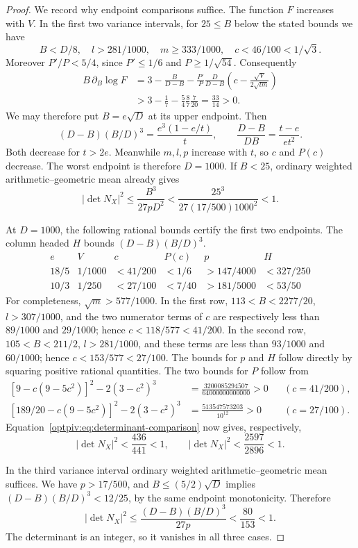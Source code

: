 \begin{proof}
We record why endpoint comparisons suffice. The function $F$ increases
with $V$. In the first two variance intervals, for $25\le B$ below the
stated bounds we have
\[
 B<D/8,\quad l>281/1000,\quad m\ge333/1000,
 \quad c<46/100<1/\sqrt3.
\]
Moreover $P'/P<5/4$, since $P'\le1/6$ and $P\ge1/\sqrt{54}$.
Consequently
\[
\begin{split}
 B\,\partial_B\log F
 &=3-\frac{B}{D-B}
 -\frac{P'}P\frac{D}{D-B}
       \left(c-\frac{\sqrt V}{2\sqrt{lm}}\right)\\
 &>3-\frac17-\frac54\frac87\frac7{20}
 =\frac{33}{14}>0.
\end{split}
\]
We may therefore put $B=e\sqrt D$ at its upper endpoint. Then
\[
 (D-B)(B/D)^3=\frac{e^3(1-e/t)}t,\qquad
 \frac{D-B}{DB}=\frac{t-e}{et^2}.
\]
Both decrease for $t>2e$. Meanwhile $m,l,p$ increase with $t$, so
$c$ and $P(c)$ decrease. The worst endpoint is therefore $D=1000$.
If $B<25$, ordinary weighted arithmetic--geometric mean already gives
\[
 |\det N_X|^2\le\frac{B^3}{27pD^2}
 <\frac{25^3}{27(17/500)1000^2}<1.
\]

At $D=1000$, the following rational bounds certify the first two
endpoints. The column headed $H$ bounds $(D-B)(B/D)^3$.
\[
\begin{array}{c|c|c|c|c|c}
 e&V&c&P(c)&p&H\\ \hline
 18/5&1/1000&<41/200&<1/6&>147/4000&<327/250\\
 10/3&1/250&<27/100&<7/40&>181/5000&<53/50
\end{array}
\]
For completeness, $\sqrt m>577/1000$. In the first row,
$113<B<2277/20$, $l>307/1000$, and the two numerator terms of $c$
are respectively less than $89/1000$ and $29/1000$; hence
$c<118/577<41/200$. In the second row, $105<B<211/2$,
$l>281/1000$, and these terms are less than $93/1000$ and $60/1000$;
hence $c<153/577<27/100$. The bounds for $p$ and $H$ follow directly
by squaring positive rational quantities. The two bounds for $P$ follow
from
\[
\begin{aligned}
 [9-c(9-5c^2)]^2-2(3-c^2)^3
 &=\frac{3200085294507}{64000000000000}>0
 &&(c=41/200),\\
 [189/20-c(9-5c^2)]^2-2(3-c^2)^3
 &=\frac{513547573203}{10^{12}}>0
 &&(c=27/100).
\end{aligned}
\]
Equation~\eqref{optpiv:eq:determinant-comparison} now gives, respectively,
\[
 |\det N_X|^2<\frac{436}{441}<1,
 \qquad |\det N_X|^2<\frac{2597}{2896}<1.
\]

In the third variance interval ordinary weighted arithmetic--geometric
mean suffices. We have $p>17/500$, and $B\le(5/2)\sqrt D$ implies
$(D-B)(B/D)^3<12/25$, by the same endpoint monotonicity.
Therefore
\[
 |\det N_X|^2\le\frac{(D-B)(B/D)^3}{27p}
 <\frac{80}{153}<1.
\]
The determinant is an integer, so it vanishes in all three cases.
\end{proof}


